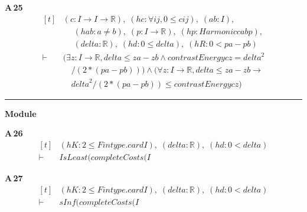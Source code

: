 \noindent\textbf{A\,25}\quad{}
{\footnotesize\[ \begin{aligned}[t]
&(\mathit{c} : \mathit{I} \to \mathit{I} \to \mathbb{R} ),\; (\mathit{hc} : \forall \mathit{i} \mathit{j}, 0 \leq \mathit{c} \mathit{i} \mathit{j}),\; (\mathit{a} \mathit{b} : \mathit{I}),\\
&\quad \; (\mathit{hab} : \mathit{a} \neq \mathit{b}),\; (\mathit{p} : \mathit{I} \to \mathbb{R} ),\; (\mathit{hp} : \mathit{Harmonic} \mathit{c} \mathit{a} \mathit{b} \mathit{p}),\\
&\quad \; (\mathit{delta} : \mathbb{R} ),\; (\mathit{hd} : 0 \leq \mathit{delta}),\; (\mathit{hR} : 0 < \mathit{p} \mathit{a}-\mathit{p} \mathit{b})\\
\vdash\;&(\exists \mathit{z} : \mathit{I} \to \mathbb{R} , \mathit{delta} \leq \mathit{z} \mathit{a}-\mathit{z} \mathit{b} \wedge \mathit{contrastEnergy} \mathit{c} \mathit{z} = \mathit{delta}^{2}\\
&\quad /(2*(\mathit{p} \mathit{a}-\mathit{p} \mathit{b}))) \wedge (\forall \mathit{z} : \mathit{I} \to \mathbb{R} , \mathit{delta} \leq \mathit{z} \mathit{a}-\mathit{z} \mathit{b} \to\\
&\quad \mathit{delta}^{2}/(2*(\mathit{p} \mathit{a}-\mathit{p} \mathit{b})) \leq \mathit{contrastEnergy} \mathit{c} \mathit{z})
\end{aligned} \]}

\vspace{4pt}\noindent\rule{\columnwidth}{0.4pt}\par\vspace{2pt}
\noindent\textbf{Module }\par\vspace{3pt}

\noindent\textbf{A\,26}\quad{}
{\footnotesize\[ \begin{aligned}[t]
&(\mathit{hK} : 2 \leq \mathit{Fintype}.\mathit{card} \mathit{I}),\; (\mathit{delta} : \mathbb{R} ),\; (\mathit{hd} : 0<\mathit{delta})\\
\vdash\;&\mathit{IsLeast} (\mathit{completeCosts} (\mathit{I}
\end{aligned} \]}

\noindent\textbf{A\,27}\quad{}
{\footnotesize\[ \begin{aligned}[t]
&(\mathit{hK} : 2 \leq \mathit{Fintype}.\mathit{card} \mathit{I}),\; (\mathit{delta} : \mathbb{R} ),\; (\mathit{hd} : 0<\mathit{delta})\\
\vdash\;&\mathit{sInf} (\mathit{completeCosts} (\mathit{I}
\end{aligned} \]}

